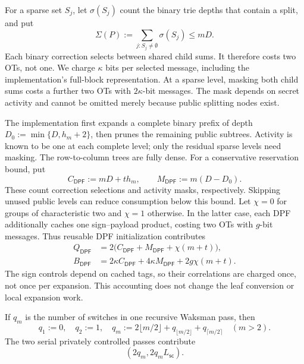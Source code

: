 For a sparse set $S_j$, let $\sigma(S_j)$ count the binary trie depths that
contain a split, and put
\begin{equation}\label{eq:waterfall-dpf-split-levels}
 \Sigma(P):=\sum_{j:S_j\neq\emptyset}\sigma(S_j)\leq mD.
\end{equation}
Each binary correction selects between shared child sums. It therefore
costs two OTs, not one. We charge $\kappa$ bits per selected message,
including the implementation's full-block representation.
At a sparse level, masking both child sums costs a further two OTs with
$2\kappa$-bit messages. The mask depends on secret activity and cannot be
omitted merely because public splitting nodes exist.

The implementation first expands a complete binary prefix of depth
$D_0:=\min\{D,h_m+2\}$, then prunes the remaining public subtrees.
Activity is known to be one at each complete level; only the residual
sparse levels need masking. The row-to-column trees are fully dense.
For a conservative reservation bound, put
\[
 C_{\mathsf{DPF}}:=mD+th_m,
 \qquad M_{\mathsf{DPF}}:=m(D-D_0).
\]
These count correction selections and activity masks, respectively.
Skipping unused public levels can reduce consumption below this bound.
Let $\chi=0$ for groups of characteristic two and $\chi=1$ otherwise.
In the latter case, each DPF additionally caches one sign--payload product,
costing two OTs with $g$-bit messages. Thus reusable DPF initialization contributes
\begin{align}
 Q_{\mathsf{DPF}}&=2\bigl(C_{\mathsf{DPF}}+M_{\mathsf{DPF}}+\chi(m+t)\bigr),
 \label{eq:waterfall-dpf-ot-count}\\
 B_{\mathsf{DPF}}&=2\kappa C_{\mathsf{DPF}}+4\kappa M_{\mathsf{DPF}}
                  +2g\chi(m+t).
 \label{eq:waterfall-dpf-ot-bits}
\end{align}
The sign controls depend on cached tags, so their correlations are charged
once, not once per expansion. This accounting does not change the leaf
conversion or local expansion work.

If $q_m$ is the number of switches in one recursive
Waksman pass, then
\[
 q_1:=0,
 \quad q_2:=1,
 \quad q_m:=2\lfloor m/2\rfloor+q_{\lfloor m/2\rfloor}
 +q_{\lceil m/2\rceil}\quad(m>2).
\]
The two serial privately controlled passes contribute
\begin{equation}\label{eq:waterfall-waksman-ot-cost}
 (2q_m,2q_mL_{\mathsf{sc}}).
\end{equation}

